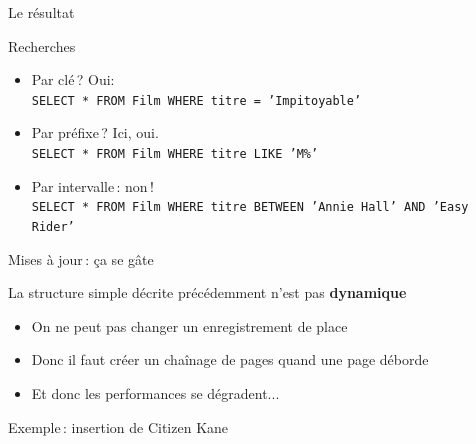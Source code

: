 \begin{frame}{Le résultat}


\end{frame}


\begin{frame}{Recherches}

\begin{itemize}
  \item Par clé\,? Oui:\\
     \texttt{SELECT * FROM  Film WHERE titre = 'Impitoyable'}

   \item Par préfixe\,? Ici, oui.\\
      \texttt{SELECT * FROM  Film WHERE titre LIKE 'M\%'}

   \item Par intervalle\,: non\,!\\

\texttt{SELECT *
FROM  Film
WHERE titre BETWEEN 'Annie Hall' AND 'Easy Rider'}
  
\end{itemize}

\end{frame}
\begin{frame}{Mises à jour\,: ça se gâte}

La structure simple décrite précédemment n'est pas
\textbf{dynamique}
\begin{itemize}
  \item On ne peut pas changer un enregistrement de place

   \item Donc  il faut créer un chaînage de pages quand
             une page déborde

  \item Et donc les performances se dégradent...
\end{itemize}

\end{frame}
\begin{frame}{Exemple\,: insertion de Citizen Kane}


\end{frame}

